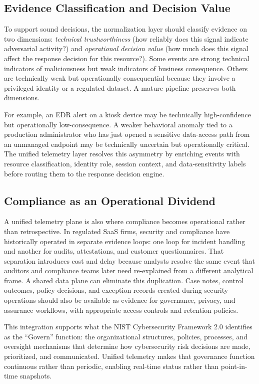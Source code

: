 \documentclass[acmlarge]{acmart}
\begin{document}
\subsection{Evidence Classification and Decision Value}

To support sound decisions, the normalization layer should classify evidence on two
dimensions: \textit{technical trustworthiness} (how reliably does this signal indicate
adversarial activity?) and \textit{operational decision value} (how much does this signal
affect the response decision for this resource?). Some events are strong technical
indicators of maliciousness but weak indicators of business consequence. Others are
technically weak but operationally consequential because they involve a privileged identity
or a regulated dataset. A mature pipeline preserves both dimensions.

For example, an EDR alert on a kiosk device may be technically high-confidence but
operationally low-consequence. A weaker behavioral anomaly tied to a production
administrator who has just opened a sensitive data-access path from an unmanaged endpoint
may be technically uncertain but operationally critical. The unified telemetry layer
resolves this asymmetry by enriching events with resource classification, identity role,
session context, and data-sensitivity labels before routing them to the response
decision engine.

\subsection{Compliance as an Operational Dividend}

A unified telemetry plane is also where compliance becomes operational rather than
retrospective. In regulated SaaS firms, security and compliance have historically operated
in separate evidence loops: one loop for incident handling and another for audits,
attestations, and customer questionnaires. That separation introduces cost and delay
because analysts resolve the same event that auditors and compliance teams later need
re-explained from a different analytical frame. A shared data plane can eliminate this
duplication. Case notes, control outcomes, policy decisions, and exception records created
during security operations should also be available as evidence for governance, privacy,
and assurance workflows, with appropriate access controls and retention policies.

This integration supports what the NIST Cybersecurity Framework 2.0 \cite{nistcsf2024}
identifies as the ``Govern'' function: the organizational structures, policies, processes,
and oversight mechanisms that determine how cybersecurity risk decisions are made, prioritized,
and communicated. Unified telemetry makes that governance function continuous rather than
periodic, enabling real-time status rather than point-in-time snapshots.
\end{document}
